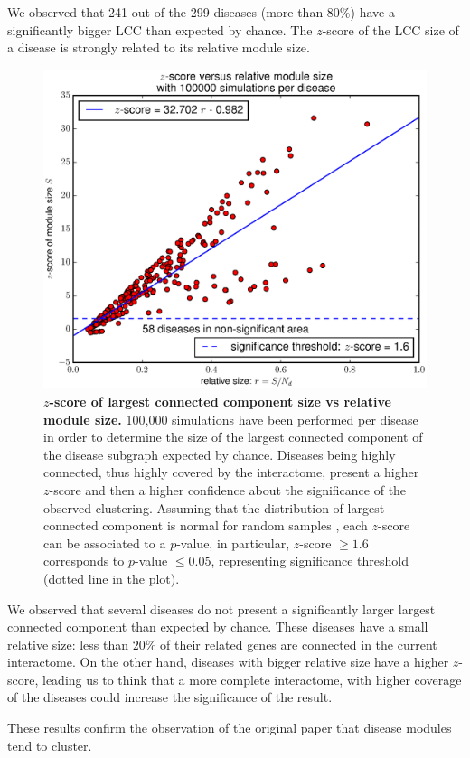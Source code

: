 \documentclass[letterpaper]{article}
\begin{document}
		We observed that 241 out of the 299 diseases (more than $80\%$) have a significantly bigger LCC than
		expected by chance. The $z$-score of the LCC size of a disease is strongly related to its relative
		module size.

		\begin{figure}[!h]
			\hspace{-.55cm}
			\includegraphics[width=.55\textwidth]{images/S4.b100000.eps}
			\vspace{-.7cm}
			\caption{\textbf {$z$-score of largest connected component size vs relative module size.}
			100,000 simulations have been performed per disease in order to determine the size of the largest
			connected component of the disease subgraph expected by chance. Diseases being highly connected,
			thus highly covered by the interactome, present a higher $z$-score and then a higher confidence
			about the significance of the observed clustering. Assuming that the distribution of largest
			connected component is normal for random samples \citep{fluctuationGiantComponent}, each $z$-score
			can be associated to a $p$-value, in particular, $z$-score $\geq 1.6$ corresponds to $p$-value
			$\leq 0.05$, representing significance threshold (dotted line in the plot).
			\label{fig:zscore}}
		\end{figure}

		We observed that several diseases do not present a significantly larger largest connected component
		than expected by chance. These diseases have a small relative size: less than $20\%$ of their related
		genes are connected in the current interactome. On the other hand, diseases with bigger relative size
		have a higher $z$-score, leading us to think that a more complete interactome, with higher coverage
		of the diseases could increase the significance of the result.

		These results confirm the observation of the original paper that disease modules tend to cluster.
\end{document}
